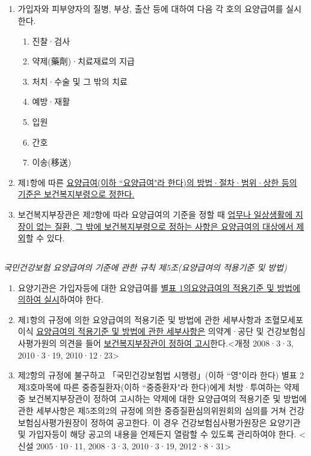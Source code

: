 \subsection{}
\begin{enumerate}[①]\tightlist
\item 가입자와 피부양자의 질병, 부상, 출산 등에 대하여 다음 각 호의 요양급여를 실시한다.
	\begin{enumerate}[	1.]\tightlist
	\item 진찰·검사
	\item 약제(藥劑)·치료재료의 지급
	\item 처치·수술 및 그 밖의 치료
	\item 예방·재활
	\item 입원
	\item 간호
	\item 이송(移送)
	\end{enumerate}
\item 제1항에 따른 \uline{요양급여(이하 ``요양급여"라 한다)의 방법·절차·범위·상한 등의 기준은 보건복지부령으로 정한다.}
\item 보건복지부장관은 제2항에 따라 요양급여의 기준을 정할 때 \uline{업무나 일상생활에 지장이 없는 질환, 그 밖에 보건복지부령으로 정하는 사항은 요양급여의 대상에서 제외}할 수 있다.
\end{enumerate}

\subsection{}
\emph{국민건강보험 요양급여의 기준에 관한 규칙  제5조(요양급여의 적용기준 및 방법)}
\begin{enumerate}[①]\tightlist
\item 요양기관은 가입자등에 대한 요양급여를 \uline{별표 1의요양급여의 적용기준 및 방법에 의하여 실시}하여야 한다.
\item 제1항의 규정에 의한 요양급여의 적용기준 및 방법에 관한 세부사항과 조혈모세포이식 \uline{요양급여의 적용기준 및 방법에 관한 세부사항은} 의약계·공단 및 건강보험심사평가원의 의견을 들어 \uline{보건복지부장관이 정하여 고시}한다.<개정 2008·3·3, 2010·3·19, 2010·12·23>
\item 제2항의 규정에 불구하고 「국민건강보험법 시행령」(이하 ``영"이라 한다) 별표 2 제3호마목에 따른 중증질환자(이하 ``중증환자"라 한다)에게 처방·투여하는 약제중 보건복지부장관이 정하여 고시하는 약제에 대한 요양급여의 적용기준 및 방법에 관한 세부사항은 제5조의2의 규정에 의한 중증질환심의위원회의 심의를 거쳐 건강보험심사평가원장이 정하여 공고한다. 이 경우 건강보험심사평가원장은 요양기관 및 가입자등이 해당 공고의 내용을 언제든지 열람할 수 있도록 관리하여야 한다. <신설 2005·10·11, 2008·3·3, 2010·3·19, 2012ㆍ8ㆍ31>
\end{enumerate}

